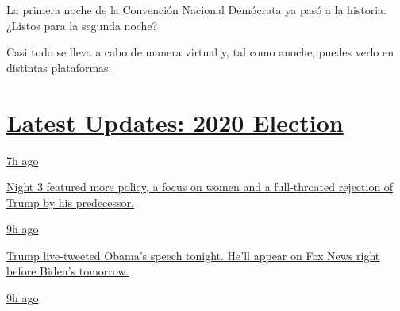 La primera noche de la Convención Nacional Demócrata ya pasó a la
historia. ¿Listos para la segunda noche?

Casi todo se lleva a cabo de manera virtual y, tal como anoche, puedes
verlo en distintas plataformas.

\hypertarget{latest-updates-2020-election}{%
\section{\texorpdfstring{\href{https://www.nytimes3xbfgragh.onion/live/2020/08/19/us/dnc-convention-election?action=click\&pgtype=Article\&state=default\&region=MAIN_CONTENT_1\&context=storylines_live_updates}{Latest
Updates: 2020
Election}}{Latest Updates: 2020 Election}}\label{latest-updates-2020-election}}

\href{https://www.nytimes3xbfgragh.onion/live/2020/08/19/us/dnc-convention-election?action=click\&pgtype=Article\&state=default\&region=MAIN_CONTENT_1\&context=storylines_live_updates\#night-3-featured-more-policy-a-focus-on-women-and-a-full-throated-rejection-of-trump-by-his-predecessor}{7h
ago}

\href{https://www.nytimes3xbfgragh.onion/live/2020/08/19/us/dnc-convention-election?action=click\&pgtype=Article\&state=default\&region=MAIN_CONTENT_1\&context=storylines_live_updates\#night-3-featured-more-policy-a-focus-on-women-and-a-full-throated-rejection-of-trump-by-his-predecessor}{Night
3 featured more policy, a focus on women and a full-throated rejection
of Trump by his predecessor.}

\href{https://www.nytimes3xbfgragh.onion/live/2020/08/19/us/dnc-convention-election?action=click\&pgtype=Article\&state=default\&region=MAIN_CONTENT_1\&context=storylines_live_updates\#trump-live-tweeted-obamas-speech-tonight-hell-appear-on-fox-news-right-before-bidens-tomorrow}{9h
ago}

\href{https://www.nytimes3xbfgragh.onion/live/2020/08/19/us/dnc-convention-election?action=click\&pgtype=Article\&state=default\&region=MAIN_CONTENT_1\&context=storylines_live_updates\#trump-live-tweeted-obamas-speech-tonight-hell-appear-on-fox-news-right-before-bidens-tomorrow}{Trump
live-tweeted Obama's speech tonight. He'll appear on Fox News right
before Biden's tomorrow.}

\href{https://www.nytimes3xbfgragh.onion/live/2020/08/19/us/dnc-convention-election?action=click\&pgtype=Article\&state=default\&region=MAIN_CONTENT_1\&context=storylines_live_updates\#advocates-for-domestic-violence-survivors-praised-biden-in-a-video}{9h
ago}

